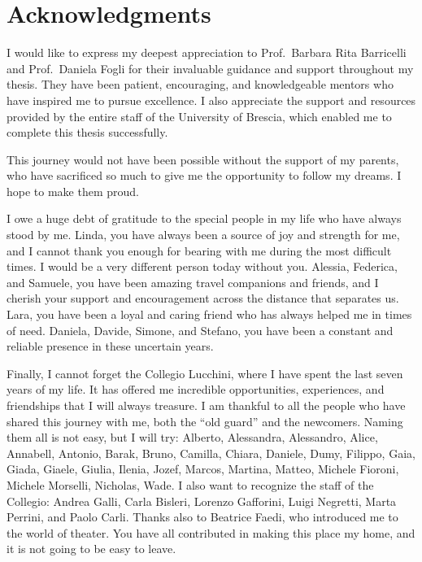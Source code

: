 \chapter*{Acknowledgments}\label{ch:acknowledgments}

I would like to express my deepest appreciation to Prof.\ Barbara Rita Barricelli and Prof.\ Daniela Fogli for their invaluable guidance and support throughout my thesis. They have been patient, encouraging, and knowledgeable mentors who have inspired me to pursue excellence. I also appreciate the support and resources provided by the entire staff of the University of Brescia, which enabled me to complete this thesis successfully.

This journey would not have been possible without the support of my parents, who have sacrificed so much to give me the opportunity to follow my dreams. I hope to make them proud.

I owe a huge debt of gratitude to the special people in my life who have always stood by me. Linda, you have always been a source of joy and strength for me, and I cannot thank you enough for bearing with me during the most difficult times. I would be a very different person today without you. Alessia, Federica, and Samuele, you have been amazing travel companions and friends, and I cherish your support and encouragement across the distance that separates us. Lara, you have been a loyal and caring friend who has always helped me in times of need. Daniela, Davide, Simone, and Stefano, you have been a constant and reliable presence in these uncertain years.

Finally, I cannot forget the Collegio Lucchini, where I have spent the last seven years of my life. It has offered me incredible opportunities, experiences, and friendships that I will always treasure. I am thankful to all the people who have shared this journey with me, both the “old guard” and the newcomers. Naming them all is not easy, but I will try: Alberto, Alessandra, Alessandro, Alice, Annabell, Antonio, Barak, Bruno, Camilla, Chiara, Daniele, Dumy, Filippo, Gaia, Giada, Giaele, Giulia, Ilenia, Jozef, Marcos, Martina, Matteo, Michele Fioroni, Michele Morselli, Nicholas, Wade. I also want to recognize the staff of the Collegio: Andrea Galli, Carla Bisleri, Lorenzo Gafforini, Luigi Negretti, Marta Perrini, and Paolo Carli. Thanks also to Beatrice Faedi, who introduced me to the world of theater. You have all contributed in making this place my home, and it is not going to be easy to leave.


